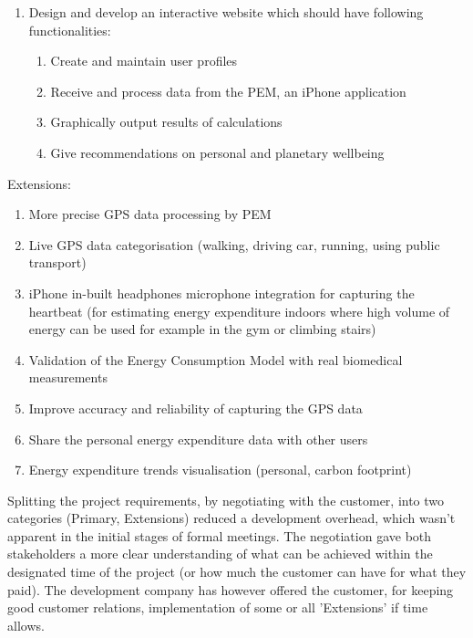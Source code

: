 \documentclass[12pt, a4paper]{report}   %
\begin{document}
\begin{enumerate}
\begin{enumerate}
		\item Design and develop an interactive website which should have following functionalities:
		\begin{enumerate}
			\item Create and maintain user profiles
			\item Receive and process data from the PEM, an iPhone application
			\item Graphically output results of calculations
			\item Give recommendations on personal and planetary wellbeing
		\end{enumerate}
	\end{enumerate}
Extensions: 
	\begin{enumerate}
		\item More precise GPS data processing by PEM
		\item Live GPS data categorisation (walking, driving car, running, using public transport)
		\item iPhone in-built headphones microphone integration for capturing the heartbeat (for estimating energy expenditure indoors where high volume of energy can be used for example in the gym or climbing stairs)
		\item Validation of the Energy Consumption Model with real biomedical measurements
		\item Improve accuracy and reliability of capturing the GPS data
		\item Share the personal energy expenditure data with other users
		\item Energy expenditure trends visualisation (personal, carbon footprint)\\
	\end{enumerate}
Splitting the project requirements, by negotiating with the customer, into two categories (Primary, Extensions) reduced a development overhead, which wasn't apparent in the initial stages of formal meetings. The negotiation gave both stakeholders a more clear understanding of what can be achieved within the designated time of the project (or how much the customer can have for what they paid). The development company has however offered the customer, for keeping good customer relations, implementation of some or all 'Extensions' if time allows.



\end{enumerate}
\end{document}
